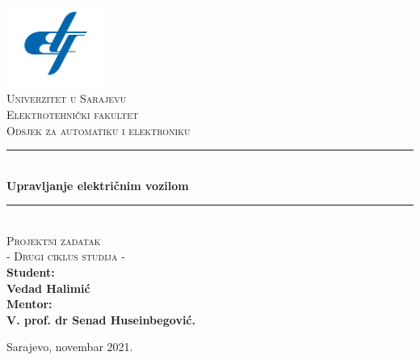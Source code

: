 \documentclass[12pt,oneside, a4paper]{book}
\newcommand{\HRule}{\rule{\linewidth}{0.5mm}}
\begin{document}

\frontmatter

\begin{titlepage}
\begin{center}

\includegraphics[width=0.25\textwidth]{etf-logo.png}~\\[0.1cm]
\textsc{\Large Univerzitet u Sarajevu}\\[0.2cm]  
\textsc{\Large Elektrotehnički fakultet}\\[0.2cm] 
\textsc{\Large Odsjek za automatiku i elektroniku}\\[3cm]\HRule \\[0.5cm] 
{\huge \bfseries Upravljanje električnim vozilom} \\[0.4cm] 
\HRule \\[0.5cm]

\textsc{\Large Projektni zadatak}\\[0.4cm]
\textsc{\Large - Drugi ciklus studija - }\\[1.5cm]

\textbf{ 
\Large Student:\\  
\Large Vedad Halimić\\[1cm]  
\Large Mentor: \\[0.2cm] 
\Large V. prof. dr Senad Huseinbegović.} 
\vfill

{\large Sarajevo, novembar 2021.}

\end{center} 
\end{titlepage}



%

%
\end{document}
